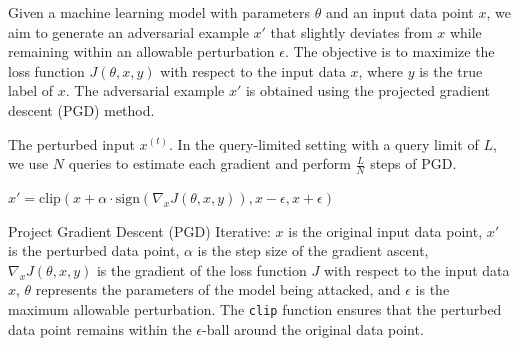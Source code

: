 
Given a machine learning model with parameters $\theta$ and an input data point $x$, we aim to generate an adversarial example $x'$ that slightly deviates from $x$ while remaining within an allowable perturbation $\epsilon$. The objective is to maximize the loss function $J(\theta, x, y)$ with respect to the input data $x$, where $y$ is the true label of $x$. The adversarial example $x'$ is obtained using the projected gradient descent (PGD) method.

The perturbed input $x^{(t)}$.
In the query-limited setting with a query limit of $L$, we use $N$ queries to estimate each gradient and perform $\frac{L}{N}$ steps of PGD.

$x' = \text{clip}(x + \alpha \cdot \text{sign}(\nabla_x J(\theta, x, y)), x - \epsilon, x + \epsilon)$

Project Gradient Descent (PGD) Iterative:
$x$ is the original input data point,
$x'$ is the perturbed data point,
$\alpha$ is the step size of the gradient ascent,
$\nabla_x J(\theta, x, y)$ is the gradient of the loss function $J$ with respect to the input data $x$,
$\theta$ represents the parameters of the model being attacked, and
$\epsilon$ is the maximum allowable perturbation.
The \texttt{clip} function ensures that the perturbed data point remains within the $\epsilon$-ball around the original data point.